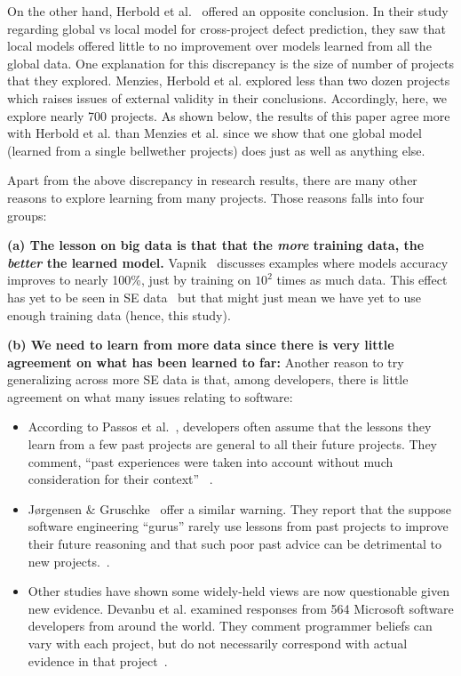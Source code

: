\documentclass[10pt,journal,compsoc]{IEEEtran}
\newcommand{\bi}{\begin{itemize}}
\newcommand{\ei}{\end{itemize}}
\begin{document}
 
On the other hand,
Herbold et al.~\cite{herbold2017global}  offered an opposite conclusion.
In their   study regarding global vs local model for cross-project defect prediction,
they saw that  local models offered little to no improvement over models learned
from all the global data.
One explanation for this discrepancy  is the size of number of projects that they explored.
Menzies, Herbold et al. explored less than two dozen projects which raises issues of external validity in their conclusions. Accordingly, here,  we explore nearly 700 projects. As shown below, the results of this paper agree  more with Herbold et al. than  Menzies et al. since we show that one global model (learned from a single bellwether projects) does just as well as anything else.

Apart from the above discrepancy in research results, there are many other reasons to
explore learning from many projects. Those reasons   falls into four groups:

\textbf{(a) The lesson on big data is that that the {\em more} training data, the {\em better} the learned model.} Vapnik~\cite{vapnik14} discusses examples where models accuracy improves to nearly 100\%, just by training on $10^2$ times as much data. This effect has yet to be seen in SE data~\cite{menzies2013guest} but that might just mean we have yet to use enough training data (hence, this study). 

\textbf{(b) We need to learn from more data since there is very little agreement on what has been learned to far:} Another reason to try generalizing across more SE data is that, among developers, there is little agreement on what many issues relating to software:
\bi
    \item
    According to Passos et al.~\cite{passos11},  developers often  assume that the lessons they learn from a few past projects are general to all their future projects. They comment, ``past experiences were taken into account without much consideration for their context'' ~\cite{passos11}. 
	\item
	J{\o}rgensen \& Gruschke~\cite{Jo09} offer a similar warning. They report that the suppose software engineering ``gurus'' rarely use lessons from past projects to improve their future reasoning and that such poor past advice can be detrimental to new projects.~\cite{Jo09}.
    \item 
    Other studies have shown some widely-held views are   now questionable given new evidence. Devanbu et al. examined responses from 564 Microsoft software developers from around
	the world. They comment programmer beliefs can vary with each project, but do not necessarily
	correspond with actual evidence in that project~\cite{De16}. 
\ei
	
\end{document}
